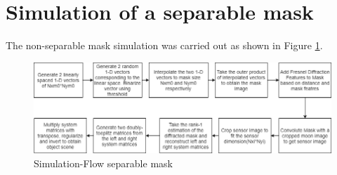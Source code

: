     
\section{Simulation of a separable mask}
The non-separable mask simulation was carried out as shown in Figure \ref{fig:sep_sim}.
\begin{figure}[ht]
\includegraphics[scale = 0.50]{pics/sep_mask_sim_flow}
\caption{Simulation-Flow separable mask}
\label{fig:sep_sim}
\end{figure}
